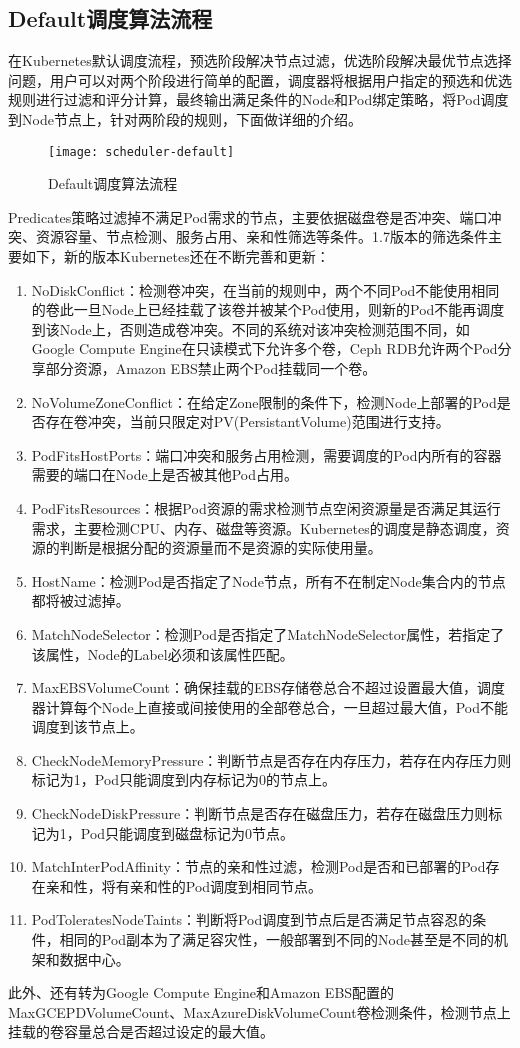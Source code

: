 \subsection{Default调度算法流程}
在Kubernetes默认调度流程，预选阶段解决节点过滤，优选阶段解决最优节点选择问题，用户可以对两个阶段进行简单的配置，调度器将根据用户指定的预选和优选规则进行过滤和评分计算，最终输出满足条件的Node和Pod绑定策略，将Pod调度到Node节点上，针对两阶段的规则，下面做详细的介绍。
\begin{figure}[H] %
	\centering
	\texttt{[image: scheduler-default]}
	\caption{Default调度算法流程}
	\label{fig:xfig1}
\end{figure}
Predicates策略过滤掉不满足Pod需求的节点，主要依据磁盘卷是否冲突、端口冲突、资源容量、节点检测、服务占用、亲和性筛选等条件。1.7版本的筛选条件主要如下，新的版本Kubernetes还在不断完善和更新：
\begin{enumerate}[(1)]
	\item NoDiskConflict：检测卷冲突，在当前的规则中，两个不同Pod不能使用相同的卷此一旦Node上已经挂载了该卷并被某个Pod使用，则新的Pod不能再调度到该Node上，否则造成卷冲突。不同的系统对该冲突检测范围不同，如Google Compute Engine在只读模式下允许多个卷，Ceph RDB允许两个Pod分享部分资源，Amazon EBS禁止两个Pod挂载同一个卷。
	\item NoVolumeZoneConflict：在给定Zone限制的条件下，检测Node上部署的Pod是否存在卷冲突，当前只限定对PV(PersistantVolume)范围进行支持。
	\item PodFitsHostPorts：端口冲突和服务占用检测，需要调度的Pod内所有的容器需要的端口在Node上是否被其他Pod占用。
	\item PodFitsResources：根据Pod资源的需求检测节点空闲资源量是否满足其运行需求，主要检测CPU、内存、磁盘等资源。Kubernetes的调度是静态调度，资源的判断是根据分配的资源量而不是资源的实际使用量。
	\item HostName：检测Pod是否指定了Node节点，所有不在制定Node集合内的节点都将被过滤掉。
	\item MatchNodeSelector：检测Pod是否指定了MatchNodeSelector属性，若指定了该属性，Node的Label必须和该属性匹配。
	\item MaxEBSVolumeCount：确保挂载的EBS存储卷总合不超过设置最大值，调度器计算每个Node上直接或间接使用的全部卷总合，一旦超过最大值，Pod不能调度到该节点上。
	\item CheckNodeMemoryPressure：判断节点是否存在内存压力，若存在内存压力则标记为1，Pod只能调度到内存标记为0的节点上。
	\item CheckNodeDiskPressure：判断节点是否存在磁盘压力，若存在磁盘压力则标记为1，Pod只能调度到磁盘标记为0节点。
	\item MatchInterPodAffinity：节点的亲和性过滤，检测Pod是否和已部署的Pod存在亲和性，将有亲和性的Pod调度到相同节点。
	\item PodToleratesNodeTaints：判断将Pod调度到节点后是否满足节点容忍的条件，相同的Pod副本为了满足容灾性，一般部署到不同的Node甚至是不同的机架和数据中心。
\end{enumerate}
此外、还有转为Google Compute Engine和Amazon EBS配置的MaxGCEPDVolumeCount、MaxAzureDiskVolumeCount卷检测条件，检测节点上挂载的卷容量总合是否超过设定的最大值。

